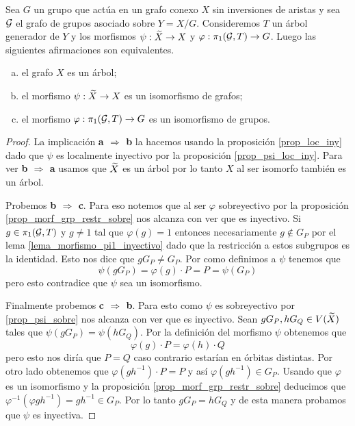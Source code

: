 \documentclass[tesis.tex]{subfiles}
\begin{document}
\begin{teo}\label{teo_Serre}
	Sea $G$ un grupo que actúa en un grafo conexo $X$ sin inversiones de aristas y sea ${\cal G}$ el grafo de grupos asociado sobre $Y = X / G$.
	Consideremos $T$ un árbol generador de $Y$ y los morfismos $\psi: \widetilde X \to X$ y $\varphi: \pi_1({\cal G}, T) \to G$.
	Luego las siguientes afirmaciones son equivalentes.
	\begin{enumerate}[(a)]
		\item el grafo $X$ es un árbol;
		\item el morfismo $\psi: \widetilde X \to X$ es un isomorfismo de grafos;
		\item el morfismo $\varphi:\pi_1({\cal G}, T) \to G$ es un isomorfismo de grupos.
	\end{enumerate}
\end{teo}

\begin{proof}	
		 La implicación \textbf{a $\Rightarrow$ b} la hacemos usando la proposición \ref{prop_loc_iny} dado que $\psi$ es localmente inyectivo por la proposición \ref{prop_psi_loc_iny}.
		 Para ver \textbf{b $\Rightarrow$ a} usamos que $\widetilde X$ es un árbol por lo tanto $X$ al ser isomorfo también es un árbol.
		 
		 Probemos \textbf{b $\Rightarrow$ c}. 
		 Para eso notemos que al ser $\varphi$ sobreyectivo por la proposición \ref{prop_morf_grp_restr_sobre} nos alcanza con ver que es inyectivo.
		 Si $g \in \pi_1({\cal G}, T)$ y $g \neq 1$ tal que $\varphi(g)= 1$ entonces necesariamente $g \notin G_P$ por el lema \ref{lema_morfismo_pi1_inyectivo} dado que la restricción a estos subgrupos es la identidad.
		 Esto nos dice que $g G_P \neq G_P $.
		 Por como definimos a $\psi$ tenemos que 
		 \[
		 \psi (gG_P ) = \varphi(g) \cdot P  = P = \psi(G_P )
		 \] 
		 pero esto contradice que $\psi$ sea un isomorfismo.
		 
		 
		 Finalmente probemos \textbf{c $\Rightarrow$ b}. 
		 Para esto como $\psi$ es sobreyectivo por \ref{prop_psi_sobre} nos alcanza con ver que es inyectivo.
		 Sean $gG_P, hG_Q \in V(\widetilde X)$ tales que $\psi(gG_P) = \psi(hG_Q)$.
		 Por la definición del morfismo $\psi$ obtenemos que 
		 \[
		 \varphi(g)\cdot P = \varphi(h)\cdot Q
		 \]
		 pero esto nos diría que $P = Q$ caso contrario estarían en órbitas distintas. 
		 Por otro lado obtenemos que $\varphi(g h^{-1}) \cdot P  =  P$ y así $\varphi(gh^{-1}) \in G_P$. 
		 Usando que $\varphi$ es un isomorfismo y la proposición \ref{prop_morf_grp_restr_sobre} deducimos que $\varphi^{-1} (\varphi gh^{-1}) = gh^{-1} \in G_P$.
		 Por lo tanto $gG_P  = hG_Q$ y de esta manera probamos que $\psi$ es inyectiva.
\end{proof}
\end{document}
